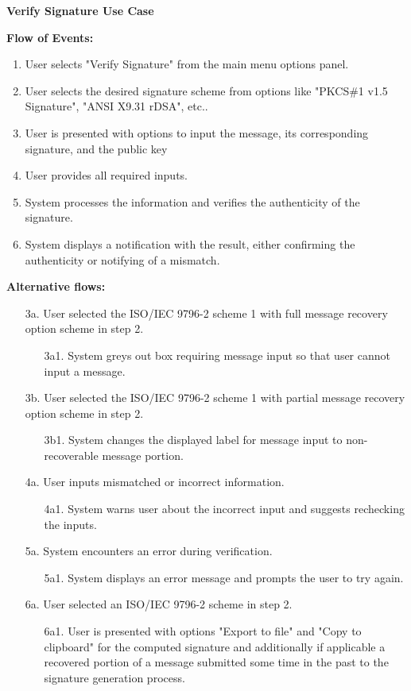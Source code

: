 \documentclass[]{final_report}
\theoremstyle{definition}
\begin{document}
\textbf{Verify Signature Use Case}

\noindent\textbf{Flow of Events:}
\begin{enumerate}
    \item User selects "Verify Signature" from the main menu options panel.
    \item User selects the desired signature scheme from options like "PKCS\#1 v1.5 Signature", "ANSI X9.31 rDSA", etc..
    \item User is presented with options to input the message, its corresponding signature, and the public key
    \item User provides all required inputs.
    \item System processes the information and verifies the authenticity of the signature.
    \item System displays a notification with the result, either confirming the authenticity or notifying of a mismatch.
\end{enumerate}

\noindent\textbf{Alternative flows:}
\begin{enumerate}
 \item[3a.]  User selected the ISO\slash IEC 9796-2 scheme 1 with full message recovery option scheme in step 2.
    \begin{enumerate}
        \item[3a1.] System greys out box requiring message input so that user cannot input a message.
    \end{enumerate}
  \item[3b.]  User selected the ISO\slash IEC 9796-2 scheme 1 with partial message recovery option scheme in step 2.
    \begin{enumerate}
        \item[3b1.] System changes the displayed label for message input to non-recoverable message portion.
    \end{enumerate}
    \item[4a.] User inputs mismatched or incorrect information.
    \begin{enumerate}
        \item[4a1.] System warns user about the incorrect input and suggests rechecking the inputs.
    \end{enumerate}
    \item[5a.] System encounters an error during verification.
    \begin{enumerate}
        \item[5a1.] System displays an error message and prompts the user to try again.
    \end{enumerate}
    \item[6a.]  User selected an ISO\slash IEC 9796-2 scheme in step 2.
    \begin{enumerate}
        \item[6a1.] User is presented with options "Export to file" and "Copy to clipboard" for the computed signature and additionally if applicable a recovered portion of a message submitted some time in the past to the signature generation process.
    \end{enumerate}
\end{enumerate}
\end{document}
